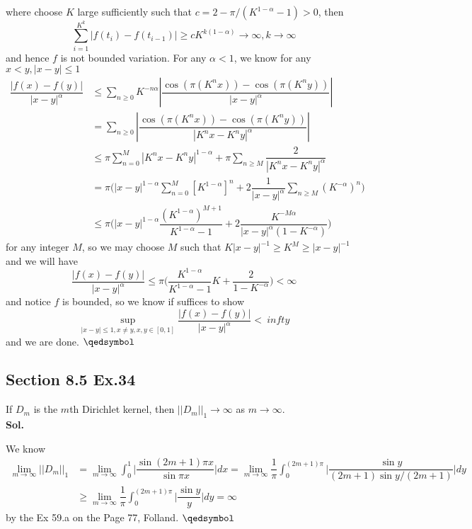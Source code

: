 \documentclass[lang=en,11pt,a4paper,citestyle =authoryear]{elegantpaper}
\newcommand{\prvd}{$\hfill \qedsymbol$}
\begin{document}
where choose $K$ large sufficiently such that $c = 2-\pi/(K^{1-\alpha}-1)>0$, then
\[
\sum\limits_{i=1}^{K^k}|f(t_i)-f(t_{i-1})| \geq cK^{k(1-\alpha)} \to \infty, k\to\infty
\]
and hence $f$ is not bounded variation. For any $\alpha<1$, we know for any $x<y, |x-y|\leq 1$
\[
\begin{aligned}
\dfrac{|f(x)-f(y)|}{|x-y|^{\alpha}} &\leq \sum\limits_{n\geq 0}K^{-n\alpha}|\dfrac{\cos(\pi(K^nx))-\cos(\pi(K^ny))}{|x-y|^{\alpha}}| \\ &= \sum\limits_{n\geq 0}|\dfrac{\cos(\pi(K^nx))-\cos(\pi(K^ny))}{|K^n x-K^n y|^{\alpha}}| \\
& \leq \pi\sum\limits_{n = 0}^M|K^{n}x-K^n y|^{1-\alpha} + \pi \sum\limits_{n\geq M} \dfrac{2}{|K^nx-K^ny|^{\alpha}} \\
&= \pi\Big(|x-y|^{1-\alpha}\sum\limits_{n = 0}^M [K^{1-\alpha}]^n + 2\dfrac{1}{|x-y|^{\alpha}} \sum\limits_{n\geq M}(K^{-\alpha})^n\Big) \\
&\leq \pi\Big(|x-y|^{1-\alpha}\dfrac{(K^{1-\alpha})^{M+1}}{K^{1-\alpha}-1} + 2\dfrac{K^{-M\alpha}}{|x-y|^{\alpha}(1-K^{-\alpha})} \Big)
\end{aligned}
\]
for any integer $M$, so we may choose $M$ such that $ K|x-y|^{-1} \geq K^{M} \geq |x-y|^{-1}$ and we will have
\[
\dfrac{|f(x)-f(y)|}{|x-y|^{\alpha}} \leq \pi\Big(\dfrac{K^{1-\alpha}}{K^{1-\alpha}-1}K + \dfrac{2}{1-K^{-\alpha}}\Big) < \infty
\]
and notice $f$ is bounded, so we know if suffices to show
\[
\sup_{|x-y|\leq 1, x\neq y, x,y\in[0,1]}\dfrac{|f(x)-f(y)|}{|x-y|^{\alpha}} <\ infty\]
and we are done.
\prvd
\vspace{0.5em}

\subsection*{Section 8.5 Ex.34} 
If $D_m$ is the $m$th Dirichlet kernel, then $||D_m||_1 \to \infty$ as $m\to\infty$.
\vspace{0.5em}\\
\textbf{Sol.} \par
We know
\[
\begin{aligned}
\lim_{m\to\infty}||D_m||_1 &= \lim_{m\to\infty}\int_0^1 \Big|\dfrac{\sin (2m+1)\pi x}{\sin\pi x}\Big| dx = \lim_{m\to\infty}\dfrac{1}{\pi}\int_0^{(2m+1)\pi} \Big|\dfrac{\sin y}{(2m+1)\sin y/(2m+1)}\Big| dy \\ &\geq \lim_{m\to\infty}\dfrac{1}{\pi}\int_0^{(2m+1)\pi} \Big|\dfrac{\sin y}{y}\Big| dy = \infty
\end{aligned}
\]
by the Ex 59.a on the Page 77, Folland.
\prvd
\vspace{0.5em}
\end{document}
